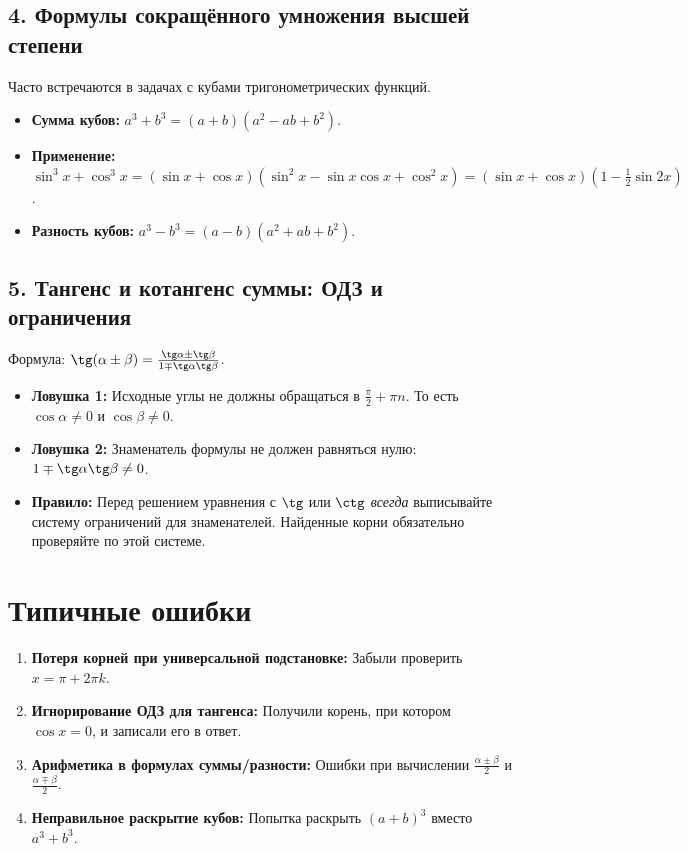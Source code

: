 \documentclass[a4paper,12pt]{article}
\begin{document}
\subsection*{4. Формулы сокращённого умножения высшей степени}
Часто встречаются в задачах с кубами тригонометрических функций.
\begin{itemize}[leftmargin=*, itemsep=2pt]
    \item \textbf{Сумма кубов:} $a^3 + b^3 = (a+b)(a^2 - ab + b^2)$.
    \item \textbf{Применение:} $\sin^3 x + \cos^3 x = (\sin x + \cos x)(\sin^2 x - \sin x\cos x + \cos^2 x) = (\sin x + \cos x)(1 - \frac{1}{2}\sin 2x)$.
    \item \textbf{Разность кубов:} $a^3 - b^3 = (a-b)(a^2 + ab + b^2)$.
\end{itemize}

\subsection*{5. Тангенс и котангенс суммы: ОДЗ и ограничения}
Формула: $\tg(\alpha \pm \beta) = \frac{\tg\alpha \pm \tg\beta}{1 \mp \tg\alpha\tg\beta}$.
\begin{itemize}[leftmargin=*, itemsep=2pt]
    \item \textbf{Ловушка 1:} Исходные углы не должны обращаться в $\frac{\pi}{2} + \pi n$. То есть $\cos\alpha \neq 0$ и $\cos\beta \neq 0$.
    \item \textbf{Ловушка 2:} Знаменатель формулы не должен равняться нулю: $1 \mp \tg\alpha\tg\beta \neq 0$.
    \item \textbf{Правило:} Перед решением уравнения с $\tg$ или $\ctg$ \textit{всегда} выписывайте систему ограничений для знаменателей. Найденные корни обязательно проверяйте по этой системе.
\end{itemize}

\section*{Типичные ошибки}
\begin{enumerate}[leftmargin=*, itemsep=2pt]
    \item \textbf{Потеря корней при универсальной подстановке:} Забыли проверить $x = \pi + 2\pi k$.
    \item \textbf{Игнорирование ОДЗ для тангенса:} Получили корень, при котором $\cos x = 0$, и записали его в ответ.
    \item \textbf{Арифметика в формулах суммы/разности:} Ошибки при вычислении $\frac{\alpha \pm \beta}{2}$ и $\frac{\alpha \mp \beta}{2}$.
    \item \textbf{Неправильное раскрытие кубов:} Попытка раскрыть $(a+b)^3$ вместо $a^3+b^3$.
\end{enumerate}
\end{document}
